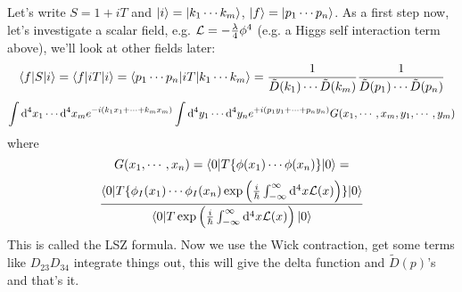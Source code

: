 Let's write $S=1+iT$ and $\mathinner{|{i}\rangle}=\mathinner{|{k_1\cdots k_m}\rangle}$, $\mathinner{|{f}\rangle}=\mathinner{|{p_1\cdots p_n}\rangle}$. As a first step now, let's investigate a scalar field, e.g. ${\mathcal L}=-{\lambda\over4}\phi^4$ (e.g. a Higgs self interaction term above), we'll look at other fields later: 
\begin{equation*}
  \mathinner{\langle{f|S|i}\rangle}= \mathinner{\langle{f|iT|i}\rangle}= \mathinner{\langle{p_1\cdots p_n|iT|k_1\cdots k_m}\rangle}= {1\over\tilde D(k_1)\cdots\tilde D(k_m)} {1\over\tilde D(p_1)\cdots\tilde D(p_n)}
\end{equation*}
\begin{equation*}
  \int{\rm d}^4 x_1\cdots {\rm d}^4 x_m e^{-i(k_1 x_1+\cdots + k_m x_m)} \int{\rm d}^4 y_1\cdots {\rm d}^4 y_n e^{+i(p_1 y_1+\cdots + p_n y_n)} G(x_1, \cdots, x_m, y_1, \cdots, y_m)
\end{equation*}
where 
\begin{equation*}
  G(x_1, \cdots, x_n)= \mathinner{\langle{0|T\{\phi(x_1)\cdots\phi(x_n)\}|0}\rangle} =
\end{equation*}
\begin{equation*}
  {\mathinner{\langle{0|T\{\phi_I(x_1)\cdots\phi_I(x_n)\exp\left({i\over\hbar}\int_{-\infty}^{\infty}{\rm d}^4 x {\mathcal L}(x) \right)\}|0}\rangle} \over \mathinner{\langle{0|T\exp\left({i\over\hbar}\int_{-\infty}^{\infty}{\rm d}^4 x {\mathcal L}(x) \right)|0}\rangle} }
\end{equation*}
This is called the LSZ formula. Now we use the Wick contraction, get some terms like $D_{23}D_{34}$ integrate things out, this will give the delta function and $\tilde D(p)$'s and that's it.

